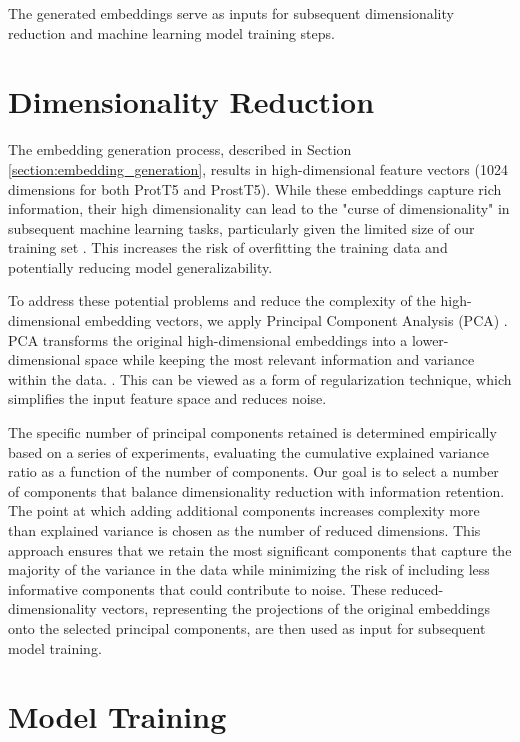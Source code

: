 The generated embeddings serve as inputs for subsequent dimensionality reduction and machine learning model training steps.


\section{Dimensionality Reduction}
\label{section:dimensionality_reduction}

The embedding generation process, described in Section \ref{section:embedding_generation}, results in high-dimensional feature vectors (1024 dimensions for both \gls{ProtT5} and \gls{ProstT5}).
While these embeddings capture rich information, their high dimensionality can lead to the "curse of dimensionality" in subsequent machine learning tasks, particularly given the limited size of our training set \cite{bishop2006pattern}.
This increases the risk of overfitting the training data and potentially reducing model generalizability.

To address these potential problems and reduce the complexity of the high-dimensional embedding vectors, we apply Principal Component Analysis (PCA) \cite{greenacre2022pca}.
\gls{PCA} transforms the original high-dimensional embeddings into a lower-dimensional space while keeping the most relevant information and variance within the data. \cite{greenacre2022pca}.
This can be viewed as a form of regularization technique, which simplifies the input feature space and reduces noise.


The specific number of principal components retained is determined empirically based on a series of experiments, evaluating the cumulative explained variance ratio as a function of the number of components.  
Our goal is to select a number of components that balance dimensionality reduction with information retention.
The point at which adding additional components increases complexity more than explained variance is chosen as the number of reduced dimensions.
This approach ensures that we retain the most significant components that capture the majority of the variance in the data while minimizing the risk of including less informative components that could contribute to noise.
These reduced-dimensionality vectors, representing the projections of the original embeddings onto the selected principal components, are then used as input for subsequent model training.

\section{Model Training}
\label{section:ml_training_evaluation}

